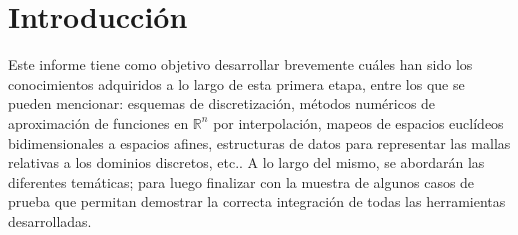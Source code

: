 \documentclass[informe.tex]{subfiles}
\begin{document}
\section{Introducción}
\label{sec:intro}
Este informe tiene como objetivo desarrollar brevemente cuáles han
sido los conocimientos adquiridos a lo largo de esta primera etapa, entre los que se pueden mencionar: esquemas de discretización, métodos
numéricos de aproximación de funciones en $\mathbb{R}^n$ por interpolación, mapeos de espacios euclídeos bidimensionales a espacios afines, estructuras de datos para representar las mallas relativas a los dominios discretos, etc.. A lo largo del mismo, se abordarán las diferentes temáticas; para luego finalizar con la muestra de algunos casos de prueba que permitan demostrar la correcta integración de todas las herramientas desarrolladas.
\end{document}
